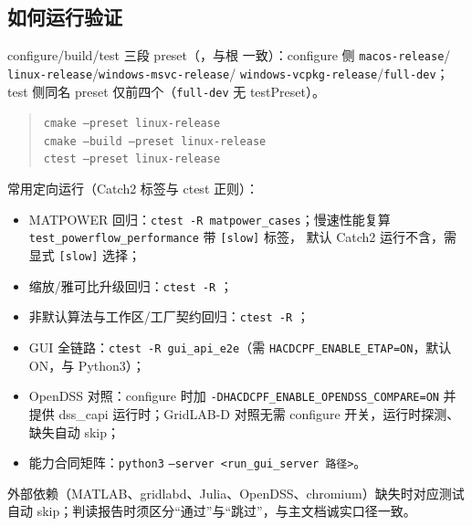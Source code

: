 \subsection{如何运行验证}
configure/build/test 三段 preset（，与根
 一致）：configure 侧 \texttt{macos-release}/
\texttt{linux-release}/\texttt{windows-msvc-release}/
\texttt{windows-vcpkg-release}/\texttt{full-dev}；test 侧同名 preset
仅前四个（\texttt{full-dev} 无 testPreset）。
\begin{quote}\footnotesize
\texttt{cmake --preset linux-release}\\
\texttt{cmake --build --preset linux-release}\\
\texttt{ctest --preset linux-release}
\end{quote}
常用定向运行（Catch2 标签与 ctest 正则）：
\begin{itemize}
  \item MATPOWER 回归：\texttt{ctest -R matpower\_cases}；慢速性能复算
        \texttt{test\_powerflow\_performance} 带 \texttt{[slow]} 标签，
        默认 Catch2 运行不含，需显式 \texttt{[slow]} 选择；
  \item 缩放/雅可比升级回归：\texttt{ctest -R}
        ；
  \item 非默认算法与工作区/工厂契约回归：\texttt{ctest -R}
        ；
  \item GUI 全链路：\texttt{ctest -R gui\_api\_e2e}（需
        \texttt{HACDCPF\_ENABLE\_ETAP=ON}，默认 ON，与 Python3）；
  \item OpenDSS 对照：configure 时加
        \texttt{-DHACDCPF\_ENABLE\_OPENDSS\_COMPARE=ON} 并提供 dss\_capi
        运行时；GridLAB-D 对照无需 configure 开关，运行时探测、缺失自动 skip；
  \item 能力合同矩阵：\texttt{python3}
        \texttt{--server <run\_gui\_server 路径>}。
\end{itemize}
外部依赖（MATLAB、gridlabd、Julia、OpenDSS、chromium）缺失时对应测试自动
skip；判读报告时须区分“通过”与“跳过”，与主文档诚实口径一致。
